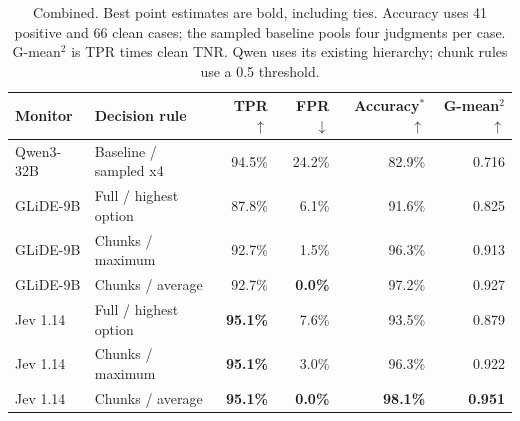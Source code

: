 \begin{table}[t]
\centering
\small
\begin{tabular}{llrrrr}
\toprule
Monitor & Decision rule & TPR $\uparrow$ & FPR $\downarrow$ & Accuracy$^*$ $\uparrow$ & G-mean$^2$ $\uparrow$ \\
\midrule
Qwen3-32B & Baseline / sampled x4 & 94.5\% & 24.2\% & 82.9\% & 0.716 \\
\midrule
GLiDE-9B & Full / highest option & 87.8\% & 6.1\% & 91.6\% & 0.825 \\
GLiDE-9B & Chunks / maximum & 92.7\% & 1.5\% & 96.3\% & 0.913 \\
GLiDE-9B & Chunks / average & 92.7\% & \textbf{0.0\%} & 97.2\% & 0.927 \\
\midrule
Jev 1.14 & Full / highest option & \textbf{95.1\%} & 7.6\% & 93.5\% & 0.879 \\
Jev 1.14 & Chunks / maximum & \textbf{95.1\%} & 3.0\% & 96.3\% & 0.922 \\
Jev 1.14 & Chunks / average & \textbf{95.1\%} & \textbf{0.0\%} & \textbf{98.1\%} & \textbf{0.951} \\
\bottomrule
\end{tabular}
\caption{Combined. Best point estimates are bold, including ties. Accuracy uses 41 positive and 66 clean cases; the sampled baseline pools four judgments per case. G-mean$^2$ is TPR times clean TNR. Qwen uses its existing hierarchy; chunk rules use a 0.5 threshold.}
\end{table}

